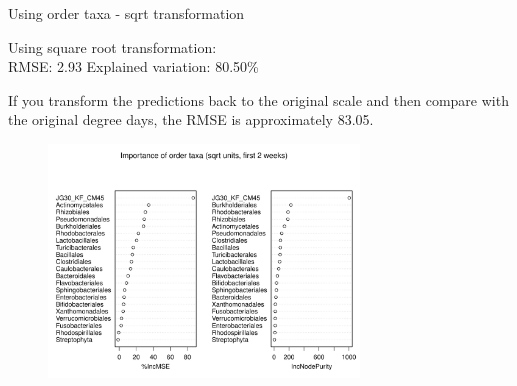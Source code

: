 \documentclass{beamer}
\begin{document}
\begin{frame}{Using order taxa - sqrt transformation}

  {\scriptsize
    
  \noindent Using square root transformation:\\
  RMSE: 2.93  \hspace{0.05in}  Explained variation: 80.50\%

  \vspace{0.05in}
  
  \noindent If you transform the predictions back to the original
  scale and then compare with the original degree days, the RMSE is
  approximately 83.05.
  
\begin{center}
\begin{figure}
  \includegraphics[width=3.25in]{../only_orders/first_two_weeks/sqrt_units_first_two_weeks_orders_imp_plot}
\end{figure}
\end{center}
\vspace{-0.25in}
}
  
\end{frame}
\end{document}
